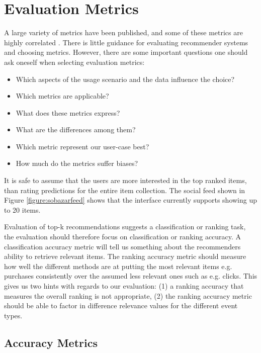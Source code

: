 

\section{Evaluation Metrics}
\label{sec:eval-metrics}


A large variety of metrics have been published, and some of these metrics are highly correlated \cite{Herlocker2004}.
There is little guidance for evaluating recommender systems and choosing metrics. However, there are
some important questions one should ask oneself when selecting evaluation metrics:

\begin{itemize}
	\item Which aspects of the usage scenario and the data influence the choice?
	\item Which metrics are applicable?
	\item What does these metrics express?
	\item What are the differences among them?
	\item Which metric represent our user-case best?
	\item How much do the metrics suffer biases?
\end{itemize}

It is safe to assume that the users are more interested in the top ranked items, than rating
predictions for the entire item collection. The social feed shown in Figure \ref{figure:sobazarfeed}
shows that the interface currently supports showing up to 20 items.

Evaluation of top-k recommendations suggests a classification or ranking task, the evaluation
should therefore focus on classification or ranking accuracy. A classification accuracy metric
will tell us something about the recommenders ability to retrieve relevant items. The ranking
accuracy metric should measure how well the different methods are at putting the most relevant items
e.g. purchases consistently over the assumed less relevant ones such as e.g. clicks. This gives us
two hints with regards to our evaluation: (1) a ranking accuracy that measures the overall ranking
is not appropriate, (2) the ranking accuracy metric should be able to factor in difference relevance
values for the different event types.


\subsection{Accuracy Metrics}

